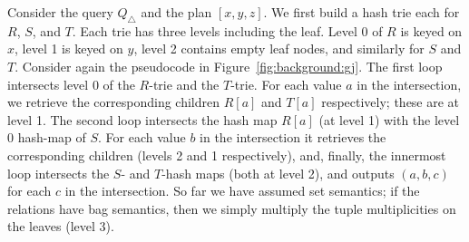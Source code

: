 \begin{example}
  Consider the query $Q_\triangle$ and the \GJ plan $[x, y, z]$.  We
  first build a hash trie each for $R$, $S$, and $T$.  Each trie has
  three levels including the leaf.  Level 0 of $R$ is keyed on $x$,
  level 1 is keyed on $y$, level 2 contains empty leaf nodes, and
  similarly for $S$ and $T$.  Consider again the pseudocode in
  Figure~\ref{fig:background:gj}.  The first loop intersects level 0
  of the $R$-trie and the $T$-trie.  For each value $a$ in the
  intersection, we retrieve the corresponding children $R[a]$ and
  $T[a]$ respectively; these are at level 1.  The second loop
  intersects the hash map $R[a]$ (at level 1) with the level 0
  hash-map of $S$.  For each value $b$ in the intersection it
  retrieves the corresponding children (levels 2 and 1 respectively),
  and, finally, the innermost loop intersects the $S$- and $T$-hash
  maps (both at level 2), and outputs $(a,b,c)$ for each $c$ in the
  intersection.  So far we have assumed set semantics; if the
  relations have bag semantics, then we simply multiply the tuple
  multiplicities on the leaves (level 3).
\end{example}


